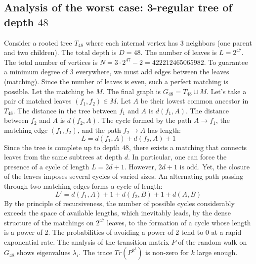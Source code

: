 \documentclass[12pt,a4paper]{article}
\begin{document}
\subsection{Analysis of the worst case: 3-regular tree of depth $48$}
Consider a rooted tree $T_{48}$ where each internal vertex has 3 neighbors (one parent and two children).
The total depth is $D = 48$.
The number of leaves is $L = 2^{47}$.
The total number of vertices is $N = 3 \cdot 2^{47} - 2 = 422212465065982$.
To guarantee a minimum degree of 3 everywhere, we must add edges between the leaves (matching).
Since the number of leaves is even, such a perfect matching is possible.
Let the matching be $M$. The final graph is $G_{48} = T_{48} \cup M$.
Let's take a pair of matched leaves $(f_1, f_2) \in M$.
Let $A$ be their lowest common ancestor in $T_{48}$.
The distance in the tree between $f_1$ and $A$ is $d(f_1, A)$.
The distance between $f_2$ and $A$ is $d(f_2, A)$.
The cycle formed by the path $A \to f_1$, the matching edge $(f_1, f_2)$, and the path $f_2 \to A$ has length:
$$ L = d(f_1, A) + d(f_2, A) + 1 $$
Since the tree is complete up to depth $48$, there exists a matching that connects leaves from the same subtrees at depth $d$.
In particular, one can force the presence of a cycle of length $L = 2d + 1$. However, $2d+1$ is odd.
Yet, the closure of the leaves imposes several cycles of varied sizes. An alternating path passing through two matching edges forms a cycle of length:
$$ L' = d(f_1, A) + 1 + d(f_2, B) + 1 + d(A, B) $$
By the principle of recursiveness, the number of possible cycles considerably exceeds the space of available lengths, which inevitably leads, by the dense structure of the matchings on $2^{47}$ leaves, to the formation of a cycle whose length is a power of 2. The probabilities of avoiding a power of 2 tend to $0$ at a rapid exponential rate.
The analysis of the transition matrix $P$ of the random walk on $G_{48}$ shows eigenvalues $\lambda_i$. The trace $Tr(P^{2^k})$ is non-zero for $k$ large enough.
\end{document}
